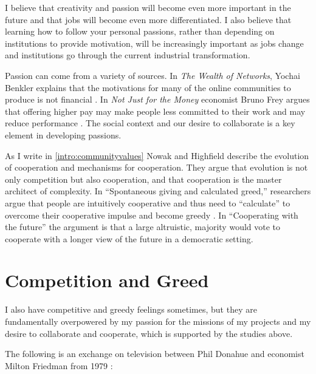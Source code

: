I believe that creativity and passion will become even more important in the future and that jobs will become even more differentiated. I also believe that learning how to follow your personal passions, rather than depending on institutions to provide motivation, will be increasingly important as jobs change and institutions go through the current industrial transformation.

Passion can come from a variety of sources. In \emph{The Wealth of Networks}, Yochai Benkler explains that the motivations for many of the online communities to produce is not financial \cite{benkler2006wealth}. In \emph{Not Just for the Money} economist Bruno Frey argues that offering higher pay may make people less committed to their work and may reduce performance \cite{frey1997not}. The social context and our desire to collaborate is a key element in developing passions.

As I write in \autoref{intro:communityvalues} Nowak and Highfield describe the evolution of cooperation and mechanisms for cooperation. They argue that evolution is not only competition but also cooperation, and that cooperation is the master architect of complexity. In ``Spontaneous giving and calculated greed,'' researchers argue that people are intuitively cooperative and thus need to ``calculate'' to overcome their cooperative impulse and become greedy \cite{rand2012spontaneous}. In ``Cooperating with the future'' \cite{hauser2014cooperating} the argument is that a large altruistic, majority would vote to cooperate with a longer view of the future in a democratic setting.

\section{Competition and Greed}

I also have competitive and greedy feelings sometimes, but they are fundamentally overpowered by my passion for the missions of my projects and my desire to collaborate and cooperate, which is supported by the studies above.

The following is an exchange on television between Phil Donahue and economist Milton Friedman from 1979 \cite{noauthor_notable_2015}:

